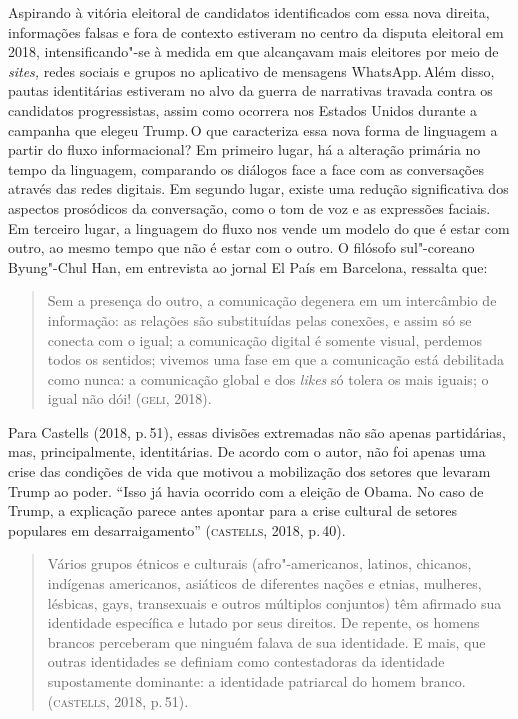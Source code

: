 Aspirando à vitória eleitoral de candidatos identificados com essa nova
direita, informações falsas e fora de contexto estiveram no centro da
disputa eleitoral em 2018, intensificando"-se à medida em que alcançavam
mais eleitores por meio de \textit{sites,} redes sociais e grupos no
aplicativo de mensagens WhatsApp.\,Além disso, pautas identitárias
estiveram no alvo da guerra de narrativas travada contra os candidatos
progressistas, assim como ocorrera nos Estados Unidos durante a campanha
que elegeu Trump.\,O que caracteriza essa nova forma de linguagem a
partir do fluxo informacional? Em primeiro lugar, há a alteração
primária no tempo da linguagem, comparando os diálogos face a face com
as conversações através das redes digitais. Em segundo lugar, existe uma
redução significativa dos aspectos prosódicos da conversação, como o tom
de voz e as expressões faciais. Em terceiro lugar, a linguagem do fluxo
nos vende um modelo do que é estar com outro, ao mesmo tempo que não é
estar com o outro. O filósofo sul"-coreano Byung"-Chul Han, em entrevista
ao jornal El País em Barcelona, ressalta que:

\begin{quote}
Sem a presença do outro, a comunicação degenera em um intercâmbio de
informação: as relações são substituídas pelas conexões, e assim só se
conecta com o igual; a comunicação digital é somente visual, perdemos
todos os sentidos; vivemos uma fase em que a comunicação está debilitada
como nunca: a comunicação global e dos \textit{likes} só tolera os mais
iguais; o igual não dói! (\textsc{geli}, 2018).
\end{quote}

Para Castells (2018, p.\,51), essas divisões extremadas não são apenas
partidárias, mas, principalmente, identitárias. De acordo com o autor,
não foi apenas uma crise das condições de vida que motivou a mobilização
dos setores que levaram Trump ao poder. ``Isso já havia ocorrido com a
eleição de Obama. No caso de Trump, a explicação parece antes apontar
para a crise cultural de setores populares em desarraigamento''
(\textsc{castells}, 2018, p.\,40).

\begin{quote}
Vários grupos étnicos e culturais (afro"-americanos, latinos, chicanos,
indígenas americanos, asiáticos de diferentes nações e etnias, mulheres,
lésbicas, gays, transexuais e outros múltiplos conjuntos) têm afirmado
sua identidade específica e lutado por seus direitos. De repente, os
homens brancos perceberam que ninguém falava de sua identidade. E mais,
que outras identidades se definiam como contestadoras da identidade
supostamente dominante: a identidade patriarcal do homem branco.
(\textsc{castells}, 2018, p.\,51).
\end{quote}

